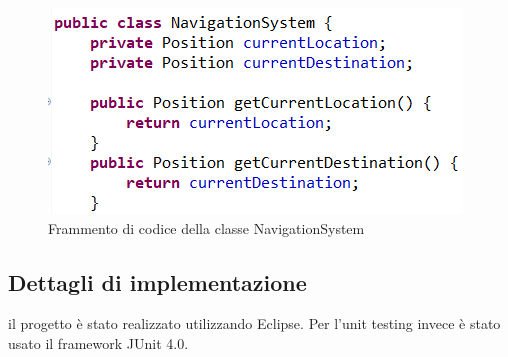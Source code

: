 \documentclass{article}
\begin{document}
\begin{itemize}
\begin{figure} [H]
\begin{center}
\includegraphics[scale=0.8]{NavigationSystem.png}
\end{center}
\caption{Frammento di codice della classe NavigationSystem}
\end{figure}

\end{itemize}


\subsection*{Dettagli di implementazione}
il progetto è stato realizzato utilizzando Eclipse. Per l'unit testing invece è stato usato il framework JUnit 4.0.
\end{document}
